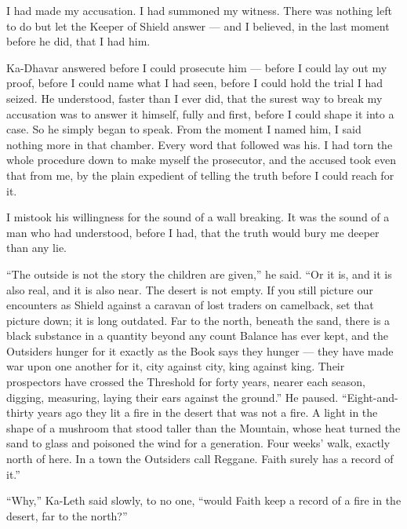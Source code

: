 I had made my accusation. I had summoned my witness. There was nothing left to do but let the Keeper of Shield answer --- and I believed, in the last moment before he did, that I had him.\par
 
\ornament
 
Ka-Dhavar answered before I could prosecute him ---
before I could lay out my proof,
before I could name what I had seen,
before I could hold the trial I had seized.
He understood, faster than I ever did, that the surest way to break my accusation was to answer it himself, fully and first, before I could shape it into a case. 
So he simply began to speak.
From the moment I named him, I said nothing more in that chamber.
Every word that followed was his.
I had torn the whole procedure down to make myself the prosecutor, and the accused took even that from me, by the plain expedient of telling the 
truth before I could reach for it.\par
 
I mistook his willingness for the sound of a wall breaking. 
It was the sound of a man who had understood, before I had, that the truth would bury me deeper than any lie.\par
 
``The outside is not the story the children are given,'' he said. ``Or it is, and it is also real, and it is also near. The desert is not empty. 
If you still picture our encounters as Shield against a caravan of lost traders on camelback, set that picture down; it is long outdated.
Far to the north, beneath the sand, there is a black substance in a quantity beyond any count Balance has ever kept, and the Outsiders hunger for 
it exactly as the Book says they hunger --- they have made war upon one another for it, city against city, king against king. 
Their prospectors have crossed the Threshold for forty years, nearer each season, digging, measuring, laying their ears against the ground.'' 
He paused. ``Eight-and-thirty years ago they lit a fire in the desert that was not a fire. A light in the shape of a mushroom
that stood taller than the Mountain, whose heat turned the sand to glass and poisoned the wind for a generation. Four weeks' walk, exactly north of here. 
In a town the Outsiders call Reggane. Faith surely has a record of it.'' 

``Why,'' Ka-Leth said slowly, to no one, ``would Faith keep a record of a fire in the desert, far to the north?''\par
 
